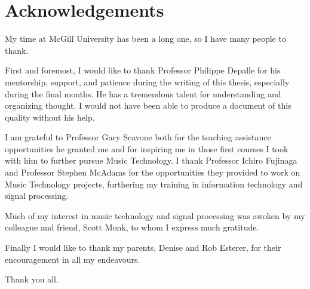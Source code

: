 \section*{Acknowledgements}
My time at McGill University has been a long one, so I have many people to
thank.

First and foremost, I would like to thank Professor Philippe Depalle for his
mentorship, support, and patience during the writing of this thesis, especially
during the final months. He has a tremendous talent for understanding and
organizing thought. I would not have been able to produce a document of this
quality without his help.

I am grateful to Professor Gary Scavone both for the teaching assistance
opportunities he granted me and for inspiring me in those first courses I took
with him to further pursue Music Technology. I thank Professor Ichiro Fujinaga
and Professor Stephen McAdams for the opportunities they provided to work on
Music Technology projects, furthering my training in information technology and
signal processing.

Much of my interest in music technology and signal processing was awoken by
my colleague and friend, Scott Monk, to whom I express much gratitude.

Finally I would like to thank my parents, Denise and Rob Esterer, for their
encouragement in all my endeavours.

Thank you all.

